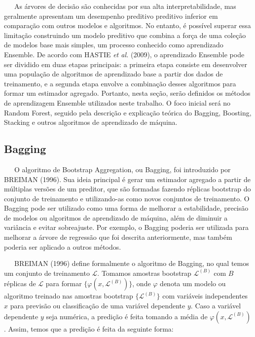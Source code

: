 \documentclass[
  12pt,
  letterpaper,
  DIV=11,
  numbers=noendperiod]{scrreprt}
\begin{document}
~~~As árvores de decisão são conhecidas por sua alta interpretabilidade,
mas geralmente apresentam um desempenho preditivo preditivo inferior em
comparação com outros modelos e algoritmos. No entanto, é possível
superar essa limitação construindo um modelo preditivo que combina a
força de uma coleção de modelos base mais simples, um processo conhecido
como aprendizado Ensemble. De acordo com HASTIE \emph{et al.} (2009), o
aprendizado Ensemble pode ser dividido em duas etapas principais: a
primeira etapa consiste em desenvolver uma população de algoritmos de
aprendizado base a partir dos dados de treinamento, e a segunda etapa
envolve a combinação desses algoritmos para formar um estimador
agregado. Portanto, nesta seção, serão definidos os métodos de
aprendizagem Ensemble utilizados neste trabalho. O foco inicial será no
Random Forest, seguido pela descrição e explicação teórica do Bagging,
Boosting, Stacking e outros algoritmos de aprendizado de máquina.

\subsection{Bagging}\label{bagging}

~~~O algoritmo de Bootstrap Aggregation, ou Bagging, foi introduzido por
BREIMAN (1996). Sua ideia principal é gerar um estimador agregado a
partir de múltiplas versões de um preditor, que são formadas fazendo
réplicas bootstrap do conjunto de treinamento e utilizando-as como novos
conjuntos de treinamento. O Bagging pode ser utilizado como uma forma de
melhorar a estabilidade, precisão de modelos ou algoritmos de
aprendizado de máquina, além de diminuir a variância e evitar
sobreajuste. Por exemplo, o Bagging poderia ser utilizada para melhorar
a árvore de regressão que foi descrita anteriormente, mas também poderia
ser aplicado a outros métodos.

\vspace{12pt}

~~~BREIMAN (1996) define formalmente o algoritmo de Bagging, no qual
temos um conjunto de treinamento \(\mathcal{L}\). Tomamos amostras
bootstrap \(\mathcal{L}^{\left(B\right)}\) com \(B\) réplicas de
\(\mathcal{L}\) para formar
\(\{\varphi \left(x, \mathcal{L}^{\left(B\right)}\right)\}\), onde
\(\varphi\) denota um modelo ou algoritmo treinado nas amostras
bootstrap \(\{\mathcal{L}^{\left(B\right)}\}\) com variáveis
independentes \(x\) para previsão ou classificação de uma variável
dependente \(y\). Caso a variável dependente \(y\) seja numérica, a
predição é feita tomando a média de
\(\varphi \left(x, \mathcal{L}^{\left(B\right)}\right)\). Assim, temos
que a predição é feita da seguinte forma:
\end{document}
